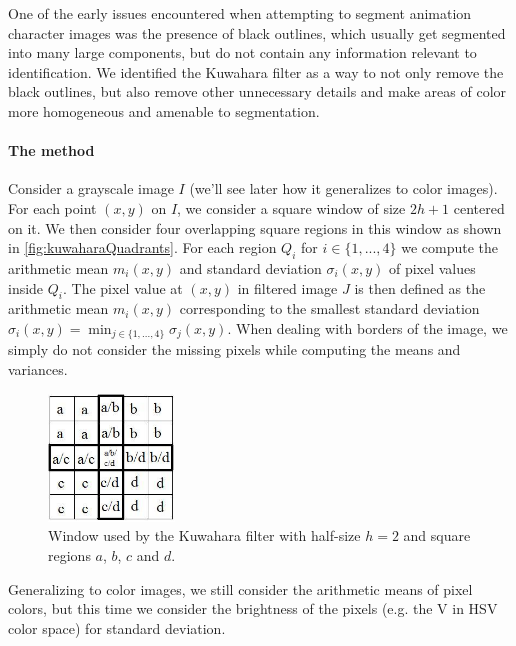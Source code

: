 One of the early issues encountered when attempting to segment animation character images was the presence of black outlines, which usually get segmented into many large components, but do not contain any information relevant to identification. We identified the Kuwahara filter \cite{kuwahara1976processing} as a way to not only remove the black outlines, but also remove other unnecessary details and make areas of color more homogeneous and amenable to segmentation.

\paragraph{The method} Consider a grayscale image $I$ (we'll see later how it generalizes to color images). For each point $(x,y)$ on $I$, we consider a square window of size $2h + 1$ centered on it. We then consider four overlapping square regions in this window as shown in \autoref{fig:kuwaharaQuadrants}. For each region $Q_i$ for $i \in \{1, ..., 4\}$ we compute the arithmetic mean $m_i(x,y)$ and standard deviation $\sigma_i(x,y)$ of pixel values inside $Q_i$. The pixel value at $(x,y)$ in filtered image $J$ is then defined as the arithmetic mean $m_i(x,y)$ corresponding to the smallest standard deviation $\sigma_i(x,y) = \min_{j \in \{1, ..., 4\}}\sigma_j(x,y)$. When dealing with borders of the image, we simply do not consider the missing pixels while computing the means and variances.

\begin{figure}[htb!]
\centering
\includegraphics[width=0.3\textwidth]{images/kuwahara_quadrants.jpg}
\caption{Window used by the Kuwahara filter with half-size $h = 2$ and square regions $a$, $b$, $c$ and $d$.}
\label{fig:kuwaharaQuadrants}
\end{figure}

Generalizing to color images, we still consider the arithmetic means of pixel colors, but this time we consider the brightness of the pixels (e.g. the V in HSV color space) for standard deviation.

